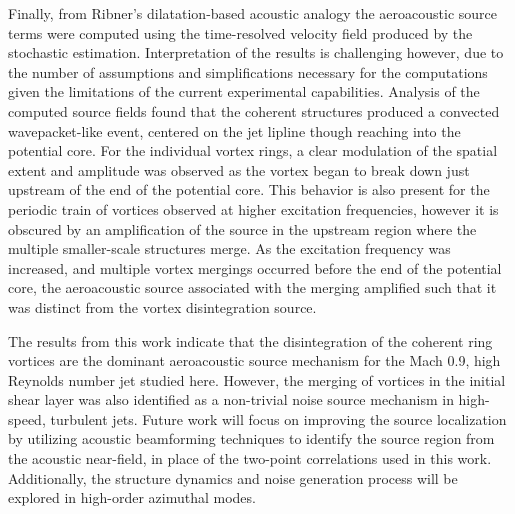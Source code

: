 Finally, from Ribner's dilatation-based acoustic analogy the aeroacoustic source terms were computed using the time-resolved velocity field produced by the stochastic estimation.
Interpretation of the results is challenging however, due to the number of assumptions and simplifications necessary for the computations given the limitations of the current experimental capabilities.
Analysis of the computed source fields found that the coherent structures produced a convected wavepacket-like event, centered on the jet lipline though reaching into the potential core.
For the individual vortex rings, a clear modulation of the spatial extent and amplitude was observed as the vortex began to break down just upstream of the end of the potential core.
This behavior is also present for the periodic train of vortices observed at higher excitation frequencies, however it is obscured by an amplification of the source in the upstream region where the multiple smaller-scale structures merge.
As the excitation frequency was increased, and multiple vortex mergings occurred before the end of the potential core, the aeroacoustic source associated with the merging amplified such that it was distinct from the vortex disintegration source.

The results from this work indicate that the disintegration of the coherent ring vortices are the dominant aeroacoustic source mechanism for the Mach 0.9, high Reynolds number jet studied here. 
However, the merging of vortices in the initial shear layer was also identified as a non-trivial noise source mechanism in high-speed, turbulent jets. 
Future work will focus on improving the source localization by utilizing acoustic beamforming techniques to identify the source region from the acoustic near-field, in place of the two-point correlations used in this work.
Additionally, the structure dynamics and noise generation process will be explored in high-order azimuthal modes.